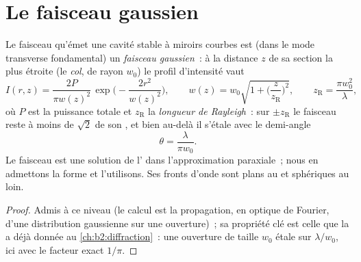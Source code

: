 \section{Le faisceau gaussien}

\begin{proposition}\label{prop:b2:laser:gaussian}
Le faisceau qu'émet une cavité stable à miroirs courbes est (dans le
mode transverse fondamental) un \emph{faisceau gaussien}~: à la distance $z$ de sa section la plus étroite (le
\emph{col}, de rayon $w_0$) le profil d'intensité
vaut
\[
I(r,z) = \frac{2P}{\pi w(z)^2}\,\exp\Big(-\frac{2r^2}{w(z)^2}\Big),
\qquad
w(z) = w_0\sqrt{1 + \Big(\frac{z}{z_{\text{R}}}\Big)^2},
\qquad
z_{\text{R}} = \frac{\pi w_0^2}{\lambda},
\]
où $P$ est la puissance totale et $z_{\text{R}}$ la \emph{longueur de
Rayleigh}~: sur $\pm z_{\text{R}}$ le faisceau reste
à moins de $\sqrt2$ de son , et bien au-delà il s'étale avec le
demi-angle
\[
\theta = \frac{\lambda}{\pi w_0} .
\]
Le faisceau est une solution de l' dans l'approximation
paraxiale~; nous en admettons la forme et l'utilisons. Ses fronts d'onde sont plans au
 et sphériques au loin.
\end{proposition}

\begin{proof}
Admis à ce niveau (le calcul est la propagation, en optique de Fourier,
d'une distribution gaussienne sur une ouverture)~; sa propriété clé est
celle que la  a déjà donnée au \cref{ch:b2:diffraction}~: une
ouverture de taille $w_0$ étale sur $\lambda/w_0$, ici avec le facteur exact
$1/\pi$.
\end{proof}

